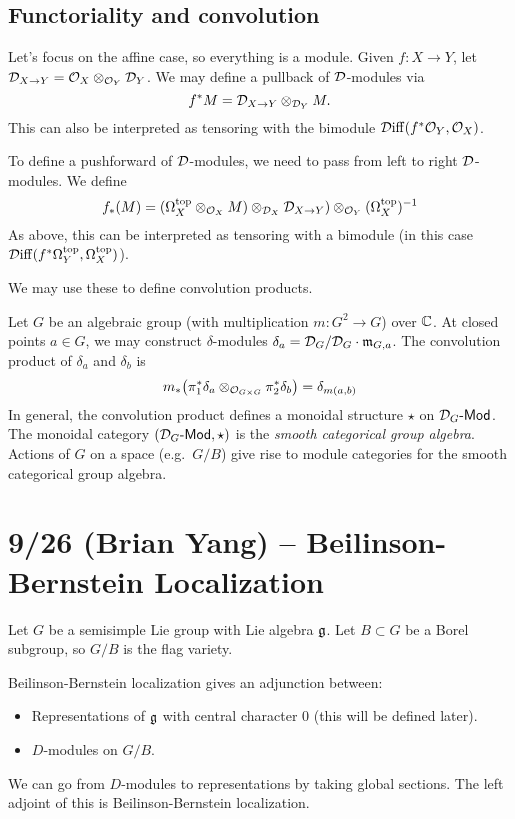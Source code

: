 \documentclass{article}
\begin{document}
\subsection{Functoriality and convolution}

Let's focus on the affine case, so everything is a module.
Given $f: X \to Y$, let $\mathcal{D}_{X \to Y} = \mathcal{O}_X \otimes_{\mathcal{O}_Y} \mathcal{D}_Y$.
We may define a pullback of $\mathcal{D}$-modules via
\[
	f^* M = \mathcal{D}_{X \to Y} \otimes_{\mathcal{D}_Y} M.
\]
This can also be interpreted as tensoring with the bimodule $\mathcal{D}\mathrm{iff}(f^* \mathcal{O}_Y, \mathcal{O}_X)$.

To define a pushforward of $\mathcal{D}$-modules, we need to pass from left to right $\mathcal{D}$-modules.
We define
\[
	f_*(M) = (\Omega_X^{\mathrm{top}} \otimes_{\mathcal{O}_X} M) \otimes_{\mathcal{D}_X} \mathcal{D}_{X \to Y}) \otimes_{\mathcal{O}_Y} (\Omega_X^{\mathrm{top}})^{-1}
\]
As above, this can be interpreted as tensoring with a bimodule (in this case $\mathcal{D}\mathrm{iff}(f^* \Omega_Y^{\mathrm{top}}, \Omega_X^{\mathrm{top}})$).

We may use these to define convolution products.

Let $G$ be an algebraic group (with multiplication $m: G^2 \to G$) over $\mathbb{C}$.
At closed points $a \in G$, we may construct $\delta$-modules $\delta_a = \mathcal{D}_G / \mathcal{D}_G \cdot \mathfrak{m}_{G,a}$.
The convolution product of $\delta_a$ and $\delta_b$ is
\[
	m_*\big(\pi_1^* \delta_a \otimes_{\mathcal{O}_{G \times G}} \pi_2^* \delta_b\big) = \delta_{m(a,b)}
\]
In general, the convolution product defines a monoidal structure $\star$ on $\mathcal{D}_G\text{-}\mathsf{Mod}$.
The monoidal category $(\mathcal{D}_G\text{-}\mathsf{Mod}, \star)$ is the \emph{smooth categorical group algebra}.
Actions of $G$ on a space (e.g.\ $G / B$) give rise to module categories for the smooth categorical group algebra.

\section{9/26 (Brian Yang) -- Beilinson-Bernstein Localization}

Let $G$ be a semisimple Lie group with Lie algebra $\mathfrak{g}$.
Let $B \subset G$ be a Borel subgroup, so $G / B$ is the flag variety.

Beilinson-Bernstein localization gives an adjunction between:
\begin{itemize}
	\item Representations of $\mathfrak{g}$ with central character $0$ (this will be defined later).
	\item $D$-modules on $G / B$.
\end{itemize}
We can go from $D$-modules to representations by taking global sections.
The left adjoint of this is Beilinson-Bernstein localization.
\end{document}
